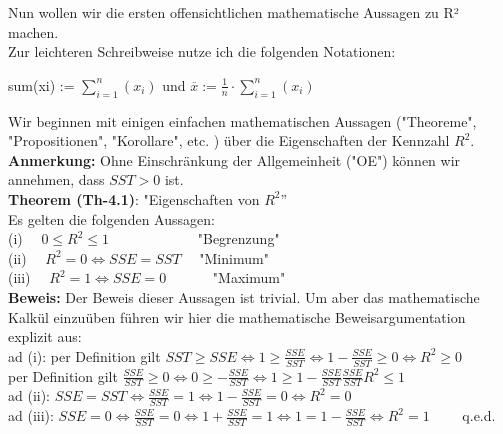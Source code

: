 \documentclass[12pt]{article}
\begin{document}
Nun wollen wir die ersten offensichtlichen mathematische Aussagen zu R² machen. \\
Zur leichteren Schreibweise nutze ich die folgenden Notationen:\\
\begin{center}
sum(xi) := $ \sum\limits_{i=1}^n(x_i) $  und  $ \overline{x} := \frac{1}{n} \cdot \sum\limits_{i=1}^n(x_i) $\\[0.2cm]
\end{center}
Wir beginnen mit einigen einfachen mathematischen Aussagen ("Theoreme", "Propositionen", "Korollare", etc. ) über die Eigenschaften der Kennzahl $R^2$.\\[0.2cm]
\textbf{Anmerkung:} Ohne Einschränkung der Allgemeinheit ("OE") können wir annehmen, dass $SST > 0$ ist.\\[0.2cm] 
%
\textbf{Theorem (Th-4.1)}: "Eigenschaften von $R^2$”\\[0.2cm]
Es gelten die folgenden Aussagen:\\[0.3cm]
(i)  $ \quad 0 \leqslant R^2 \leqslant 1 \quad\quad\quad\quad\quad\quad $   "Begrenzung"\\[0.2cm]                                       
(ii) $ \quad R^2 = 0 \Leftrightarrow SSE = SST \quad $                      "Minimum"\\[0.2cm]                                       
(iii) $ \quad R^2 = 1 \Leftrightarrow SSE = 0 \quad\quad\quad $                 "Maximum"\\[0.4cm]                                       
\textbf{Beweis:}
Der Beweis dieser Aussagen ist trivial. Um aber das mathematische Kalkül einzuüben führen wir hier die mathematische Beweisargumentation explizit aus:\\[0.2cm]
ad (i): per Definition gilt $ SST \geqslant SSE \Leftrightarrow 1 \geqslant \frac{SSE}{SST} \Leftrightarrow 1- \frac{SSE}{SST} \geqslant 0 \Leftrightarrow R^2\geqslant 0 $\\[0.2cm]                                       
per Definition gilt $ \frac{SSE}{SST} \geqslant 0 \Leftrightarrow 0 \geqslant -\frac{SSE}{SST} \Leftrightarrow 1 \geqslant 1- \frac{SSE}{SST} \frac{SSE}{SST} R^2 \leqslant 1 $ \\[0.3cm]                                       
ad (ii): $ SSE = SST \Leftrightarrow \frac{SSE}{SST} = 1 \Leftrightarrow 1 - \frac{SSE}{SST} = 0 \Leftrightarrow R^2 = 0 $ \\[0.2cm]                                                                           
ad (iii): $SSE = 0 \Leftrightarrow \frac{SSE}{SST} = 0 \Leftrightarrow  1 + \frac{SSE}{SST} = 1 \Leftrightarrow  1 = 1 -  \frac{SSE}{SST} \Leftrightarrow  R^2 = 1 \qquad $ q.e.d. \\[0.3cm] 
\end{document}
